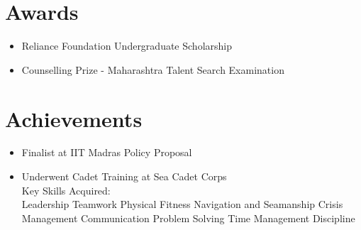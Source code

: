 \documentclass[]{resume}
\begin{document}
\begin{minipage}[t]{0.33\textwidth}

\section{Awards}
{\small \begin{itemize}
    \item Reliance Foundation Undergraduate Scholarship
    \item Counselling Prize - Maharashtra Talent Search Examination
\end{itemize}}
\sectionsep


\section{Achievements}
    {\small 
\begin{itemize}
    \item Finalist at IIT Madras Policy Proposal\href{https://github.com/User-DK/Resume/blob/main/assets/Policy%20proposaliitm(daivikandpratima)final.pdf}{\faLink}
    \item Underwent Cadet Training at Sea Cadet Corps\href{https://github.com/User-DK/Resume/blob/main/assets/cadet.pdf}{\faLink} \\

    Key Skills Acquired: \\
    Leadership \textbullet{} Teamwork \textbullet{} Physical Fitness \textbullet{} Navigation and Seamanship \textbullet{} Crisis Management \textbullet{} Communication \textbullet{} Problem Solving \textbullet{} Time Management \textbullet{} Discipline
\end{itemize}
    }
\sectionsep


\end{minipage}
\end{document}
